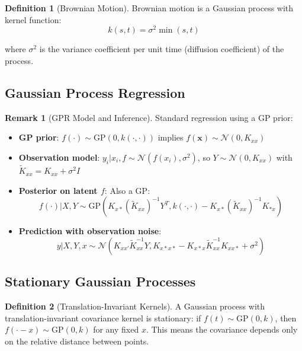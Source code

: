 \documentclass[12pt,a4paper]{article}
\theoremstyle{definition}
\newtheorem{definition}{Definition}[section]
\newtheorem{remark}{Remark}[section]
\begin{document}
\begin{definition}[Brownian Motion]
Brownian motion is a Gaussian process with kernel function:
\[
k(s, t) = \sigma^2 \min(s, t)
\]

where $\sigma^2$ is the variance coefficient per unit time (diffusion coefficient) of the process.
\end{definition}

\subsection{Gaussian Process Regression}

\begin{remark}[GPR Model and Inference]
Standard regression using a GP prior:

\begin{itemize}
    \item \textbf{GP prior}: $f(\cdot) \sim \text{GP}(0, k(\cdot, \cdot))$ implies $f(\mathbf{x}) \sim \mathcal{N}(0, K_{xx})$
    
    \item \textbf{Observation model}: $y_i | x_i, f \sim \mathcal{N}(f(x_i), \sigma^2)$, so $Y \sim \mathcal{N}(0, K_{xx})$ with $\tilde{K}_{xx} = K_{xx} + \sigma^2 I$
    
    \item \textbf{Posterior on latent $f$}: Also a GP:
    \[
    f(\cdot) | X, Y \sim \text{GP}\left(K_{x*}(\tilde{K}_{xx})^{-1} Y^T, k(\cdot, \cdot) - K_{x*}(\tilde{K}_{xx})^{-1} K_{*x}\right)
    \]
    
    \item \textbf{Prediction with observation noise}:
    \[
    y | X, Y, x \sim \mathcal{N}\left(K_{xx'} \tilde{K}_{xx}^{-1} Y, K_{x*x*} - K_{x*x} \tilde{K}_{xx}^{-1} K_{xx*} + \sigma^2\right)
    \]
\end{itemize}
\end{remark}

\subsection{Stationary Gaussian Processes}

\begin{definition}[Translation-Invariant Kernels]
A Gaussian process with translation-invariant covariance kernel is stationary: if $f(t) \sim \text{GP}(0, k)$, then $f(\cdot - x) \sim \text{GP}(0, k)$ for any fixed $x$. This means the covariance depends only on the relative distance between points.
\end{definition}
\end{document}
